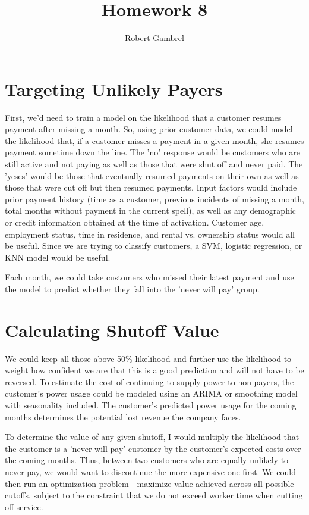 \documentclass[]{article}
\title{Homework 8}
\author{Robert Gambrel}
\begin{document}
\maketitle


\section{Targeting Unlikely Payers}
\begin{large}
First, we'd need to train a model on the likelihood that a customer resumes payment after missing a month. So, using prior customer data, we could model the likelihood that, if a customer misses a payment in a given month, she resumes payment sometime down the line. The 'no' response would be customers who are still active and not paying as well as those that were shut off and never paid. The 'yeses' would be those that eventually resumed payments on their own as well as those that were cut off but then resumed payments. Input factors would include prior payment history (time as a customer, previous incidents of missing a month, total months without payment in the current spell), as well as any demographic or credit information obtained at the time of activation. Customer age, employment status, time in residence, and rental vs. ownership status would all be useful. Since we are trying to classify customers, a SVM, logistic regression, or KNN model would be useful.

Each month, we could take customers who missed their latest payment and use the model to predict whether they fall into the 'never will pay' group. 

\section{Calculating Shutoff Value}

We could keep all those above 50\% likelihood and further use the likelihood to weight how confident we are that this is a good prediction and will not have to be reversed. To estimate the cost of continuing to supply power to non-payers, the customer's power usage could be modeled using an ARIMA or smoothing model with seasonality included. The customer's predicted power usage for the coming months determines the potential lost revenue the company faces.

To determine the value of any given shutoff, I would multiply the likelihood that the customer is a 'never will pay' customer by the customer's expected costs over the coming months. Thus, between two customers who are equally unlikely to never pay, we would want to discontinue the more expensive one first. We could then run an optimization problem - maximize value achieved across all possible cutoffs, subject to the constraint that we do not exceed worker time when cutting off service.


\end{large}
\end{document}
